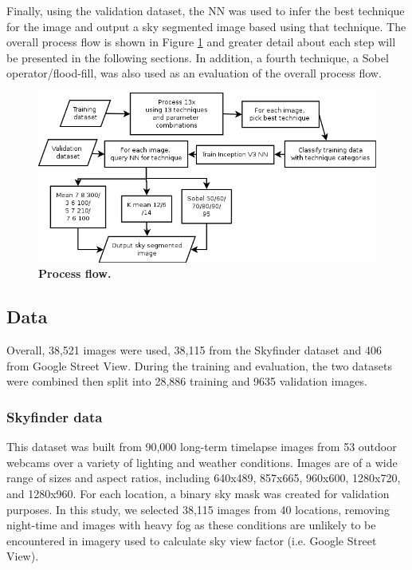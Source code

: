 \documentclass[final,3p,times,authoryear]{elsarticle}
\begin{document}
Finally, using the validation dataset, the NN was used to infer the best technique for the image and output a sky segmented image based using that technique. The overall process flow is shown in Figure \ref{fig:process} and greater detail about each step will be presented in the following sections. In addition, a fourth technique, a Sobel operator/flood-fill, was also used as an evaluation of the overall process flow.

\begin{figure}
\centering    
\includegraphics[scale=0.70]{Images/TrainingProcessDiagram}
\caption{\bf  Process flow.}    
 \label{fig:process}  
\end{figure} 


\subsection{Data}\label{sec:data}
Overall, 38,521 images were used, 38,115 from the Skyfinder dataset and 406 from Google Street View. During the training and evaluation, the two datasets were combined then split into 28,886 training and 9635 validation images.


\subsubsection{Skyfinder data}\label{sec:finderdata}
This dataset was built from 90,000 long-term timelapse images from 53 outdoor webcams over a variety of lighting and weather conditions. Images are of a wide range of sizes and aspect ratios, including 640x489, 857x665, 960x600, 1280x720, and 1280x960. For each location, a binary sky mask was created for validation purposes. In this study, we selected 38,115 images from 40 locations, removing night-time and images with heavy fog as these conditions are unlikely to be encountered in imagery used to calculate sky view factor (i.e. Google Street View).
\end{document}

